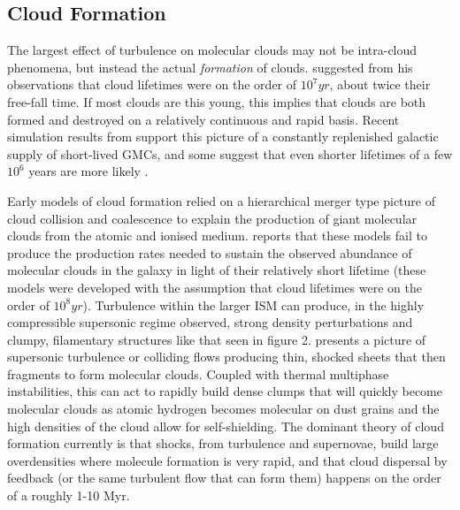 \documentclass[12pt, preprint]{aastex}
\begin{document}
\subsection{Cloud Formation}
The largest effect of turbulence on molecular clouds may not be intra-cloud
phenomena, but instead the actual \textit{formation} of clouds.
\citet{larson1981} suggested from his observations that cloud lifetimes were on
the order of $10^7 yr$, about twice their free-fall time.  If most clouds are
this young, this implies that clouds are both formed and destroyed on a
relatively continuous and rapid basis. Recent simulation results from
\citet{hopk2011} support this picture of a constantly replenished galactic supply of
short-lived GMCs, and some suggest that even shorter lifetimes of a few $10^6$
years are more likely \citep{mac2004}.

Early models of cloud formation relied on a hierarchical merger type picture of
cloud collision and coalescence to explain the production of giant molecular
clouds from the atomic and ionised medium.  \citet{larson1981} reports that
these models fail to produce the production rates needed to sustain the observed
abundance of molecular clouds in the galaxy in light of their relatively short
lifetime (these models were developed with the assumption that cloud lifetimes
were on the order of $10^8 yr$).  Turbulence within the larger ISM can produce, 
in the highly compressible supersonic regime observed, strong density perturbations and
clumpy, filamentary structures like that seen in figure 2.  \citet{val2006}
presents a picture of supersonic turbulence or colliding flows producing thin, 
shocked sheets that then fragments to form molecular clouds. Coupled with
thermal multiphase instabilities, this can act to rapidly build dense clumps
that will quickly become molecular clouds as atomic hydrogen becomes molecular
on dust grains and the high densities of the cloud allow for self-shielding.
The dominant theory of cloud formation currently is that shocks, from turbulence
and supernovae, build large overdensities where molecule formation is very
rapid, and that cloud dispersal by feedback (or the same turbulent flow that
can form them) happens on the order of a roughly 1-10 Myr.
\end{document}
